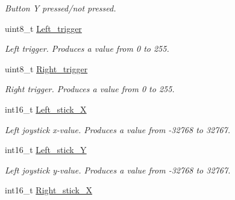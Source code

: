 \begin{DoxyCompactItemize}
\begin{DoxyCompactList}\small\item\em Button Y pressed/not pressed. \end{DoxyCompactList}\item 
\hypertarget{structbutton_aab887f94fef5bd12e3d14838a15c7a10}{uint8\-\_\-t \hyperlink{structbutton_aab887f94fef5bd12e3d14838a15c7a10}{Left\-\_\-trigger}}\label{structbutton_aab887f94fef5bd12e3d14838a15c7a10}

\begin{DoxyCompactList}\small\item\em Left trigger. Produces a value from 0 to 255. \end{DoxyCompactList}\item 
\hypertarget{structbutton_a79bedbdbd5a48a621f7a6d8a06b82bf8}{uint8\-\_\-t \hyperlink{structbutton_a79bedbdbd5a48a621f7a6d8a06b82bf8}{Right\-\_\-trigger}}\label{structbutton_a79bedbdbd5a48a621f7a6d8a06b82bf8}

\begin{DoxyCompactList}\small\item\em Right trigger. Produces a value from 0 to 255. \end{DoxyCompactList}\item 
\hypertarget{structbutton_a301836b32a4bd9f8e4269df153eb55d7}{int16\-\_\-t \hyperlink{structbutton_a301836b32a4bd9f8e4269df153eb55d7}{Left\-\_\-stick\-\_\-\-X}}\label{structbutton_a301836b32a4bd9f8e4269df153eb55d7}

\begin{DoxyCompactList}\small\item\em Left joystick x-\/value. Produces a value from -\/32768 to 32767. \end{DoxyCompactList}\item 
\hypertarget{structbutton_a3fa918572febd2d9e75dbef1929cfe23}{int16\-\_\-t \hyperlink{structbutton_a3fa918572febd2d9e75dbef1929cfe23}{Left\-\_\-stick\-\_\-\-Y}}\label{structbutton_a3fa918572febd2d9e75dbef1929cfe23}

\begin{DoxyCompactList}\small\item\em Left joystick y-\/value. Produces a value from -\/32768 to 32767. \end{DoxyCompactList}\item 
\hypertarget{structbutton_a7fa6690fc1458901c72ef7997270fea7}{int16\-\_\-t \hyperlink{structbutton_a7fa6690fc1458901c72ef7997270fea7}{Right\-\_\-stick\-\_\-\-X}}\label{structbutton_a7fa6690fc1458901c72ef7997270fea7}


\end{DoxyCompactItemize}

